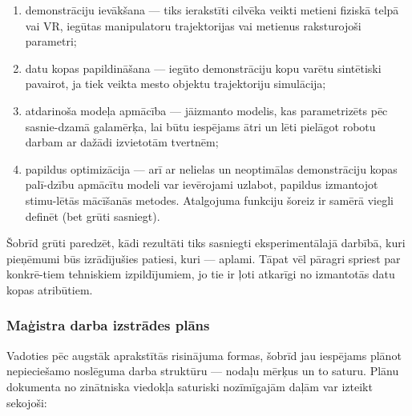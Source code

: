 \documentclass[12pt, a4paper]{article}
\numberwithin{equation}{section} %
\begin{document}
\begin{enumerate}
    \item demonstrāciju ievākšana --- tiks ierakstīti cilvēka veikti metieni fiziskā telpā vai VR, iegūtas manipulatoru trajektorijas vai metienus raksturojoši parametri;
    \item datu kopas papildināšana --- iegūto demonstrāciju kopu varētu sintētiski pavairot, ja tiek veikta mesto objektu trajektoriju simulācija;
    \item atdarinoša modeļa apmācība --- jāizmanto modelis, kas parametrizēts pēc sasnie-dzamā galamērķa, lai būtu iespējams ātri un lēti pielāgot robotu darbam ar dažādi izvietotām tvertnēm;
    \item papildus optimizācija --- arī ar nelielas un neoptimālas demonstrāciju kopas palī-dzību apmācītu modeli var ievērojami uzlabot, papildus izmantojot stimu-lētās mācīšanās metodes. Atalgojuma funkciju šoreiz ir samērā viegli definēt (bet grūti sasniegt).
\end{enumerate}

Šobrīd grūti paredzēt, kādi rezultāti tiks sasniegti eksperimentālajā darbībā, kuri pieņēmumi būs izrādījušies patiesi, kuri --- aplami. Tāpat vēl pāragri spriest par konkrē-tiem tehniskiem izpildījumiem, jo tie ir ļoti atkarīgi no izmantotās datu kopas atribūtiem.

\subsubsection{Maģistra darba izstrādes plāns}

Vadoties pēc augstāk aprakstītās risinājuma formas, šobrīd jau iespējams plānot nepieciešamo noslēguma darba struktūru --- nodaļu mērķus un to saturu. Plānu dokumenta no zinātniska viedokļa saturiski nozīmīgajām daļām var izteikt sekojoši:
\end{document}
